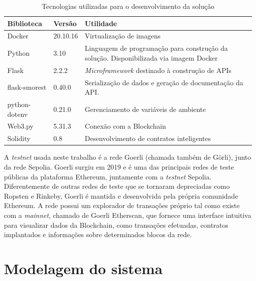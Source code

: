\begin{table}[H]
    \centering
    \begin{tabular}{ | p{3cm} | p{1.75cm} | p{10cm} |}
        \hline
        \textbf{Biblioteca} & \textbf{Versão} & \textbf{Utilidade}\\
        \hline

        Docker & 20.10.16 & Virtualização de imagens  \\
        \hline

        Python & 3.10 & Linguagem de programação para construção da solução. Disponibilizada via imagem Docker  \\
        \hline

        Flask & 2.2.2 & \emph{Microframework} destinado à construção de APIs  \\
        \hline

        flask-smorest & 0.40.0 & Serialização de dados e geração de documentação da API.  \\
        \hline

        python-dotenv & 0.21.0 & Gerenciamento de variáveis de ambiente  \\
        \hline

        Web3.py & 5.31.3 & Conexão com a Blockchain  \\
        \hline

        Solidity & 0.8 & Desenvolvimento de contratos inteligentes  \\
        \hline
    \end{tabular}
    \caption{Tecnologias utilizadas para o desenvolvimento da solução}
    \label{tab:tecnologias_utilizadas}
\end{table}

A \emph{testnet} usada neste trabalho é a rede Goerli (chamada também de Görli), junto da rede Sepolia. Goerli surgiu em 2019 e é uma das principais redes de teste públicas da plataforma Ethereum, juntamente com a \emph{testnet} Sepolia. Diferentemente de outras redes de teste que se tornaram depreciadas como Ropsten e Rinkeby, Goerli é mantida e desenvolvida pela própria comunidade Ethereum. A rede possui um explorador de transações próprio tal como existe com a \emph{mainnet}, chamado de Goerli Etherscan, que fornece uma interface intuitiva para visualizar dados da Blockchain, como transações efetuadas, contratos implantados e informações sobre determinados blocos da rede.

\section{Modelagem do sistema}
